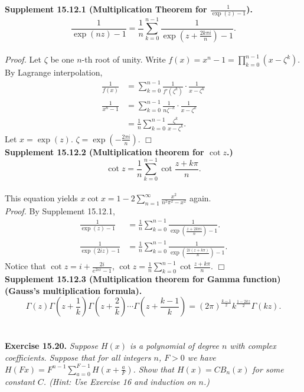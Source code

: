\documentclass{article}
\begin{document}
\textbf{Supplement 15.12.1 (Multiplication Theorem for $\frac{1}{\exp(z) - 1}$).}
\emph{$$\frac{1}{\exp(nz) - 1}
= \frac{1}{n} \sum_{k=0}^{n-1} \frac{1}{\exp(z + \frac{2 k \pi i}{n}) - 1}.$$} \\
\emph{Proof.}
Let $\zeta$ be one $n$-th root of unity.
Write $f(x) = x^n - 1 = \prod_{k=0}^{n-1}(x - \zeta^k)$.
By Lagrange interpolation,
\begin{align*}
\frac{1}{f(x)}
&=
\sum_{k=0}^{n-1} \frac{1}{f'(\zeta^k)} \cdot \frac{1}{x - \zeta^k} \\
\frac{1}{x^n - 1}
&= \sum_{k=0}^{n-1} \frac{1}{n \zeta^{-k}} \cdot \frac{1}{x - \zeta^k} \\
&= \frac{1}{n} \sum_{k=0}^{n-1} \frac{\zeta^k}{x - \zeta^k}.
\end{align*}
Let $x = \exp(z)$. $\zeta = \exp(-\frac{2 \pi i}{n})$.
$\Box$ \\

\textbf{Supplement 15.12.2 (Multiplication theorem for $\cot z$.)}
\emph{$$\cot z = \frac{1}{n} \sum_{k=0}^{n-1} \cot\frac{z + k\pi}{n}.$$} \\

This equation yields
$x \cot x = 1 - 2 \sum_{n=1}^{\infty} \frac{x^2}{n^2 \pi^2 - x^2}$ again. \\

\emph{Proof.}
By Supplement 15.12.1,
\begin{align*}
\frac{1}{\exp(z) - 1}
&=
\frac{1}{n} \sum_{k=0}^{n-1} \frac{1}{\exp(\frac{z + 2 k \pi i}{n}) - 1}. \\
\frac{1}{\exp(2iz) - 1}
&=
\frac{1}{n} \sum_{k=0}^{n-1} \frac{1}{\exp(\frac{2i (z + k \pi)}{n}) - 1}.
\end{align*}
Notice that $\cot z = i + \frac{2i}{e^{2ix} - 1}$,
$\cot z = \frac{1}{n} \sum_{k=0}^{n-1} \cot\frac{z + k\pi}{n}$.
$\Box$ \\

\textbf{Supplement 15.12.3
(Multiplication theorem for Gamma function)
(Gauss's multiplication formula).} \\

\emph{
$$\Gamma(z)
\Gamma\left( z+\frac{1}{k} \right)
\Gamma\left( z+\frac{2}{k} \right) \cdots
\Gamma\left( z+\frac{k-1}{k} \right)
= (2\pi)^{\frac{k-1}{2}} k^{\frac{1-2kz}{2}}
\Gamma\left( kz \right).$$} \\\\



\textbf{Exercise 15.20.}
\emph{Suppose $H(x)$ is a polynomial of degree $n$ with complex coefficients.
Suppose that for all integers $n$, $F > 0$ we have
$H(Fx) = F^{n-1}\sum_{a=0}^{F-1}H(x+\frac{a}{F})$.
Show that $H(x) = CB_n(x)$ for some constant $C$.
(Hint: Use Exercise 16 and induction on $n$.)} \\
\end{document}
